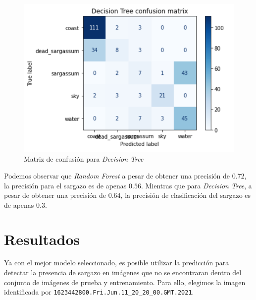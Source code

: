 \documentclass[conference]{IEEEtran}
\begin{document}
\begin{itemize}
		\begin{figure}[H]
		    \centering
		    \includegraphics[scale=0.4]{imgs/dt_confusion_mat.png}
		    \caption{Matriz de confusión para \textit{Decision Tree}}
		    \label{fig:dt_cm}
		\end{figure}
		
\end{itemize}


Podemos observar que \textit{Random Forest} a pesar de obtener una precisión de $0.72$, la precisión para el sargazo es de apenas $0.56$. Mientras que para \textit{Decision Tree}, a pesar de obtener una precisión de $0.64$, la precisión de clasificación del sargazo es de apenas $0.3$.


\section{Resultados}

Ya con el mejor modelo seleccionado, es posible utilizar la predicción para detectar la presencia de sargazo en imágenes que no se encontraran dentro del conjunto de imágenes de prueba y entrenamiento. Para ello, elegimos la imagen identificada por \verb|1623442800.Fri.Jun.11_20_20_00.GMT.2021|.
\end{document}
